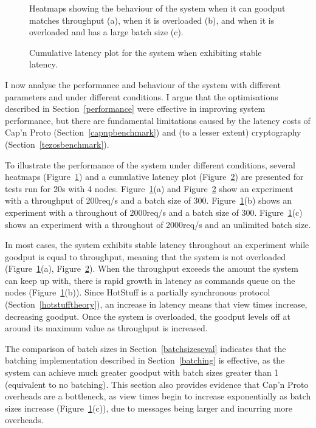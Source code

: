 \begin{figure}[h]
\centering
\resizebox{.8\textwidth}{!}{}
\caption{Heatmaps showing the behaviour of the system when it can goodput matches throughput (a), when it is overloaded (b), and when it is overloaded and has a large batch size (c).}
\label{heatmaps}
\end{figure}

\begin{figure}[h]
\centering
\resizebox{.6\textwidth}{!}{}
\caption{Cumulative latency plot for the system when exhibiting stable latency.}
\label{ecdfstable}
\end{figure}

I now analyse the performance and behaviour of the system with different parameters and under different conditions. I argue that the optimisations described in Section~\ref{performance} were effective in improving system performance, but there are fundamental limitations caused by the latency costs of Cap'n Proto (Section~\ref{capnpbenchmark}) and (to a lesser extent) cryptography (Section~\ref{tezosbenchmark}).

To illustrate the performance of the system under different conditions, several heatmaps (Figure~\ref{heatmaps}) and a cumulative latency plot (Figure~\ref{ecdfstable}) are presented for tests run for 20s with 4 nodes. Figure~\ref{heatmaps}(a) and Figure~\ref{ecdfstable} show an experiment with a throughput of 200req/s and a batch size of 300. Figure~\ref{heatmaps}(b) shows an experiment with a throughout of 2000req/s and a batch size of 300. Figure~\ref{heatmaps}(c) shows an experiment with a throughout of 2000req/s and an unlimited batch size.

In most cases, the system exhibits stable latency throughout an experiment while goodput is equal to throughput, meaning that the system is not overloaded (Figure~\ref{heatmaps}(a), Figure~\ref{ecdfstable}). When the throughput exceeds the amount the system can keep up with, there is rapid growth in latency as commands queue on the nodes (Figure~\ref{heatmaps}(b)). Since HotStuff is a partially synchronous protocol (Section~\ref{hotstufftheory}), an increase in latency means that view times increase, decreasing goodput. Once the system is overloaded, the goodput levels off at around its maximum value as throughput is increased.

The comparison of batch sizes in Section~\ref{batchsizeseval} indicates that the batching implementation described in Section~\ref{batching} is effective, as the system can achieve much greater goodput with batch sizes greater than 1 (equivalent to no batching). This section also provides evidence that Cap'n Proto overheads are a bottleneck, as view times begin to increase exponentially as batch sizes increase (Figure~\ref{heatmaps}(c)), due to messages being larger and incurring more overheads.

